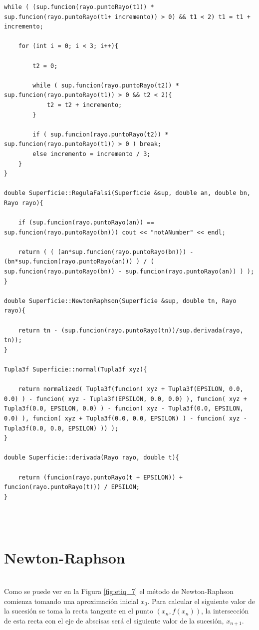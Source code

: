 \begin{lstlisting}[style=Consola]
	while ( (sup.funcion(rayo.puntoRayo(t1)) * sup.funcion(rayo.puntoRayo(t1+ incremento)) > 0) && t1 < 2) t1 = t1 + incremento;
	
	for (int i = 0; i < 3; i++){
	
		t2 = 0;
		
		while ( sup.funcion(rayo.puntoRayo(t2)) * sup.funcion(rayo.puntoRayo(t1)) > 0 && t2 < 2){
			t2 = t2 + incremento;
		}
		
		if ( sup.funcion(rayo.puntoRayo(t2)) * sup.funcion(rayo.puntoRayo(t1)) > 0 ) break;
		else incremento = incremento / 3;
	}
}

double Superficie::RegulaFalsi(Superficie &sup, double an, double bn, Rayo rayo){

	if (sup.funcion(rayo.puntoRayo(an)) == sup.funcion(rayo.puntoRayo(bn))) cout << "notANumber" << endl;
	
	return ( ( (an*sup.funcion(rayo.puntoRayo(bn))) - (bn*sup.funcion(rayo.puntoRayo(an))) ) / ( sup.funcion(rayo.puntoRayo(bn)) - sup.funcion(rayo.puntoRayo(an)) ) );
}

double Superficie::NewtonRaphson(Superficie &sup, double tn, Rayo rayo){

	return tn - (sup.funcion(rayo.puntoRayo(tn))/sup.derivada(rayo, tn));
}

Tupla3f Superficie::normal(Tupla3f xyz){

	return normalized( Tupla3f(funcion( xyz + Tupla3f(EPSILON, 0.0, 0.0) ) - funcion( xyz - Tupla3f(EPSILON, 0.0, 0.0) ), funcion( xyz + Tupla3f(0.0, EPSILON, 0.0) ) - funcion( xyz - Tupla3f(0.0, EPSILON, 0.0) ), funcion( xyz + Tupla3f(0.0, 0.0, EPSILON) ) - funcion( xyz - Tupla3f(0.0, 0.0, EPSILON) )) );
}

double Superficie::derivada(Rayo rayo, double t){

	return (funcion(rayo.puntoRayo(t + EPSILON)) + funcion(rayo.puntoRayo(t))) / EPSILON;
}
\end{lstlisting}
${ }$\\



${ }$\\
\section{Newton-Raphson}
${ }$\\

Como se puede ver en la Figura \ref{fig:etiq_7} el método de Newton-Raphson comienza tomando una aproximación inicial $x_0$. Para calcular el siguiente valor de la sucesión se toma la recta tangente en el punto $(x_n, f(x_n))$, la intersección de esta recta con el eje de abscisas será el siguiente valor de la sucesión, $x_{n+1}$.
${ }$\\

